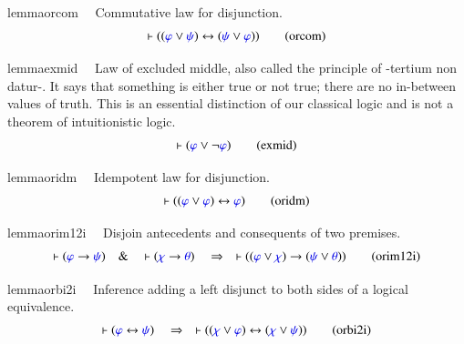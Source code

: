 \begin{restatable}{lemma}{orcom}~~ Commutative law for disjunction.  
\begin{align}
\vdash ( ( \mw{\varphi} \vee \mw{\psi} ) \leftrightarrow ( \mw{\psi} \vee
    \mw{\varphi} ) )\label{eq:orcom}\tag{orcom}
\end{align}
\end{restatable}

\begin{restatable}{lemma}{exmid}~~ Law of excluded middle, also called the
principle of -tertium non datur-.  It says that something is
     either true or not true; there are no in-between values of truth.  This
is
     an essential distinction of our classical logic and is not a theorem of
     intuitionistic logic.  
\begin{align}
\vdash ( \mw{\varphi} \vee \lnot \mw{\varphi} )\label{eq:exmid}\tag{exmid}
\end{align}
\end{restatable}

\begin{restatable}{lemma}{oridm}~~ Idempotent law for disjunction. 
\begin{align}
\vdash ( ( \mw{\varphi} \vee \mw{\varphi} ) \leftrightarrow \mw{\varphi}
    )\label{eq:oridm}\tag{oridm}
\end{align}
\end{restatable}

\begin{restatable}{lemma}{orim12i}~~ Disjoin antecedents and consequents of two
premises.  ~  ~
\begin{align}
\vdash ( \mw{\varphi} \rightarrow \mw{\psi} )\quad\&\quad \vdash ( \mw{\chi}
    \rightarrow \mw{\theta} )\quad\Rightarrow\quad \vdash ( ( \mw{\varphi} \vee
    \mw{\chi} ) \rightarrow ( \mw{\psi} \vee \mw{\theta} )
    )\label{eq:orim12i}\tag{orim12i}
\end{align}
\end{restatable}

\begin{restatable}{lemma}{orbi2i}~~ Inference adding a left disjunct to both
sides of a logical equivalence.
       ~  ~
\begin{align}
\vdash ( \mw{\varphi} \leftrightarrow \mw{\psi} )\quad\Rightarrow\quad \vdash (
    ( \mw{\chi} \vee \mw{\varphi} ) \leftrightarrow ( \mw{\chi} \vee \mw{\psi}
    ) )\label{eq:orbi2i}\tag{orbi2i}
\end{align}
\end{restatable}

